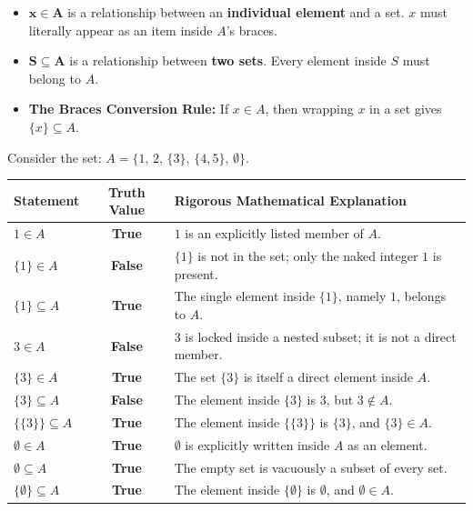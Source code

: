 \documentclass[11pt,a4paper]{article}
\begin{document}
\begin{defbox}
\begin{itemize}
    \item $\mathbf{x \in A}$ is a relationship between an \textbf{individual element} and a set. $x$ must literally appear as an item inside $A$'s braces.
    \item $\mathbf{S \subseteq A}$ is a relationship between \textbf{two sets}. Every element inside $S$ must belong to $A$.
    \item \textbf{The Braces Conversion Rule:} If $x \in A$, then wrapping $x$ in a set gives $\{x\} \subseteq A$.
\end{itemize}
\end{defbox}

\begin{examplebox}[Master Example: Analyzing $A = \{1, 2, \{3\}, \{4, 5\}, \emptyset\}$]
Consider the set: $A = \{1, \, 2, \, \{3\}, \, \{4, 5\}, \, \emptyset\}$.
\begin{center}
\renewcommand{\arraystretch}{1.3}
\begin{tabularx}{\textwidth}{l c X}
\toprule
\rowcolor{navy!10} \textbf{Statement} & \textbf{Truth Value} & \textbf{Rigorous Mathematical Explanation} \\
\midrule
$1 \in A$ & \textbf{True} & $1$ is an explicitly listed member of $A$. \\
$\{1\} \in A$ & \textbf{False} & $\{1\}$ is not in the set; only the naked integer $1$ is present. \\
$\{1\} \subseteq A$ & \textbf{True} & The single element inside $\{1\}$, namely $1$, belongs to $A$. \\
$3 \in A$ & \textbf{False} & $3$ is locked inside a nested subset; it is not a direct member. \\
$\{3\} \in A$ & \textbf{True} & The set $\{3\}$ is itself a direct element inside $A$. \\
$\{3\} \subseteq A$ & \textbf{False} & The element inside $\{3\}$ is $3$, but $3 \notin A$. \\
$\{\{3\}\} \subseteq A$ & \textbf{True} & The element inside $\{\{3\}\}$ is $\{3\}$, and $\{3\} \in A$. \\
$\emptyset \in A$ & \textbf{True} & $\emptyset$ is explicitly written inside $A$ as an element. \\
$\emptyset \subseteq A$ & \textbf{True} & The empty set is vacuously a subset of every set. \\
$\{\emptyset\} \subseteq A$ & \textbf{True} & The element inside $\{\emptyset\}$ is $\emptyset$, and $\emptyset \in A$. \\
\bottomrule
\end{tabularx}
\end{center}
\end{examplebox}
\end{document}
